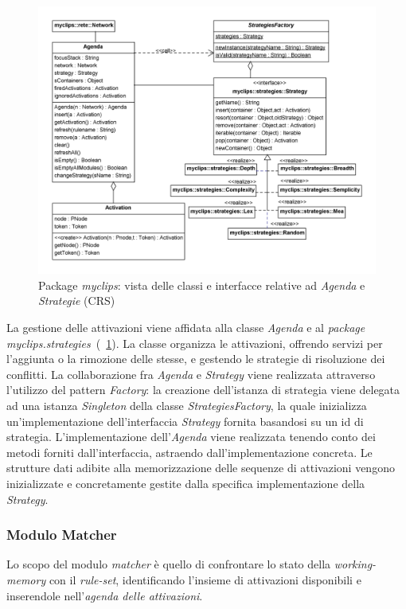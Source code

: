 \begin{figure}
\centering
\includegraphics[width=1\textwidth]{Immagini/Capitolo3/Classi/myclips_Agenda-Strategies.png}
\caption{Package \emph{myclips}: vista delle classi e interfacce relative ad  \emph{Agenda} e \emph{Strategie} (CRS)}\label{fig:class-myclips-agenda-strategies}
\end{figure}

La gestione delle attivazioni viene affidata alla classe \emph{Agenda} e al \emph{package} \emph{myclips.strategies}~(\figurename~\ref{fig:class-myclips-agenda-strategies}). La classe organizza le attivazioni, offrendo servizi per l'aggiunta o la rimozione delle stesse, e gestendo le strategie di risoluzione dei conflitti. La collaborazione fra \emph{Agenda} e \emph{Strategy} viene realizzata attraverso l'utilizzo del pattern \emph{Factory}: la creazione dell'istanza di strategia viene delegata ad una istanza \emph{Singleton} della classe \emph{StrategiesFactory}, la quale inizializza un'implementazione dell'interfaccia \emph{Strategy} fornita basandosi su un id di strategia. L'implementazione dell'\emph{Agenda} viene realizzata tenendo conto dei metodi forniti dall'interfaccia, astraendo dall'implementazione concreta. Le strutture dati adibite alla memorizzazione delle sequenze di attivazioni vengono inizializzate e concretamente gestite dalla specifica implementazione della \emph{Strategy}.


\subsubsection{Modulo Matcher}
Lo scopo del modulo \emph{matcher} è quello di confrontare lo stato della \emph{working-memory} con il \emph{rule-set}, identificando l'insieme di attivazioni disponibili e inserendole nell'\emph{agenda delle attivazioni}.

